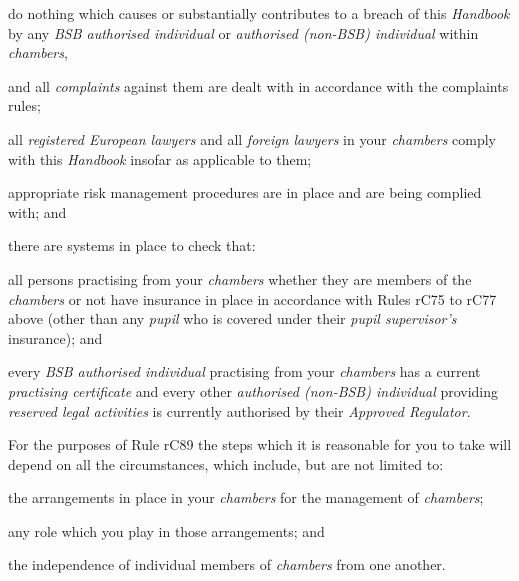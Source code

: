 \begin{numlist}
\begin{alphlist}
\item do nothing which causes or substantially contributes to a breach of
this \emph{Handbook} by any \emph{BSB authorised individual} or
\emph{authorised (non-BSB) individual} within \emph{chambers},

and all \emph{complaints} against them are dealt with in accordance with
the complaints rules;\end{alphlist}

\item all \emph{registered European lawyers} and all \emph{foreign lawyers}
in your \emph{chambers} comply with this \emph{Handbook} insofar as
applicable to them;

\item appropriate risk management procedures are in place and are being
complied with; and

\item there are systems in place to check that:
\begin{alphlist}
\item all persons practising from your \emph{chambers} whether they are
members of the \emph{chambers} or not have insurance in place in
accordance with Rules rC75 to rC77 above (other than any \emph{pupil}
who is covered under their \emph{pupil supervisor's} insurance); and

\item every \emph{BSB authorised individual} practising from your
\emph{chambers} has a current \emph{practising certificate} and every
other \emph{authorised (non-BSB) individual} providing \emph{reserved
legal activities} is currently authorised by their \emph{Approved
Regulator}.
\end{alphlist}
\end{numlist}

For the purposes of Rule rC89 the steps which it is reasonable for you
to take will depend on all the circumstances, which include, but are not
limited to:
\begin{numlist}
\item the arrangements in place in your \emph{chambers} for the management
of \emph{chambers};

\item any role which you play in those arrangements; and

\item the independence of individual members of \emph{chambers} from one
another.
\end{numlist}


